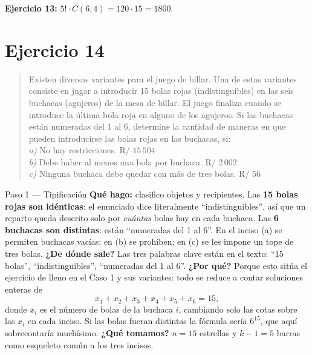 \documentclass[11pt]{article}
\begin{document}
\begin{resp}
\textbf{Ejercicio 13:} $5!\cdot C(6,4)=120\cdot 15=1800$.
\end{resp}

\section*{Ejercicio 14}

\begin{quote}
Existen diversas variantes para el juego de billar. Una de estas variantes consiste en jugar a introducir 15 bolas rojas (indistinguibles) en las seis buchacas (agujeros) de la mesa de billar. El juego finaliza cuando se introduce la última bola roja en alguno de los agujeros. Si las buchacas están numeradas del 1 al 6, determine la cantidad de maneras en que pueden introducirse las bolas rojas en las buchacas, si:\\
\textit{a)} No hay restricciones. \hfill R/ $15\,504$\\
\textit{b)} Debe haber al menos una bola por buchaca. \hfill R/ $2\,002$\\
\textit{c)} Ninguna buchaca debe quedar con más de tres bolas. \hfill R/ $56$
\end{quote}

\begin{paso}{Paso 1 --- Tipificación}
\textbf{Qué hago:} clasifico objetos y recipientes.
Las \textbf{15 bolas rojas son idénticas}: el enunciado dice literalmente ``indistinguibles'', así que un reparto queda descrito solo por \emph{cuántas} bolas hay en cada buchaca. Las \textbf{6 buchacas son distintas}: están ``numeradas del 1 al 6''. En el inciso (a) se permiten buchacas vacías; en (b) se prohíben; en (c) se les impone un tope de tres bolas.
\textbf{¿De dónde sale?} Las tres palabras clave están en el texto: ``15 bolas'', ``indistinguibles'', ``numeradas del 1 al 6''.
\textbf{¿Por qué?} Porque esto sitúa el ejercicio de lleno en el Caso 1 y sus variantes: todo se reduce a contar soluciones enteras de
\[
x_1+x_2+x_3+x_4+x_5+x_6=15 ,
\]
donde $x_i$ es el número de bolas de la buchaca $i$, cambiando solo las cotas sobre las $x_i$ en cada inciso. Si las bolas fueran distintas la fórmula sería $6^{15}$, que aquí sobrecontaría muchísimo.
\textbf{¿Qué tomamos?} $n=15$ estrellas y $k-1=5$ barras como esqueleto común a los tres incisos.
\end{paso}
\end{document}
